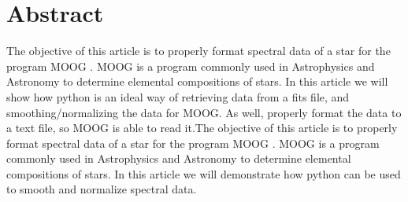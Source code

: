 \section{Abstract}
The objective of this article is to properly format spectral data of a star for the program MOOG \cite{moog}. MOOG is a program commonly used in Astrophysics and Astronomy to determine elemental compositions of stars. In this article we will show how python is an ideal way of retrieving data from a fits file, and smoothing/normalizing the data for MOOG. As well, properly format the data to a text file, so MOOG is able to read it.The objective of this article is to properly format spectral data of a star for the program MOOG \cite{moog}. MOOG is a program commonly used in Astrophysics and Astronomy to determine elemental compositions of stars. In this article  we will demonstrate how python can be used to smooth and normalize spectral data.
